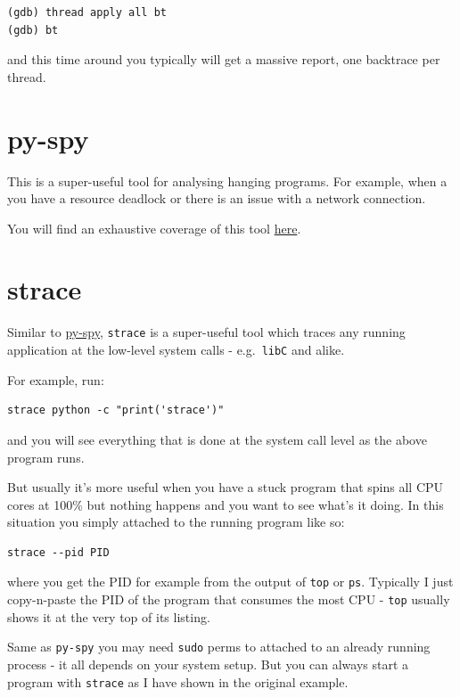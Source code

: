 \documentclass[
]{report}
\begin{document}
\begin{verbatim}
(gdb) thread apply all bt
(gdb) bt
\end{verbatim}

and this time around you typically will get a massive report, one
backtrace per thread.

\section{py-spy}\label{py-spy}

This is a super-useful tool for analysing hanging programs. For example,
when a you have a resource deadlock or there is an issue with a network
connection.

You will find an exhaustive coverage of this tool
\href{./torch-distributed-hanging-solutions.md\#py-spy}{here}.

\section{strace}\label{strace}

Similar to
\href{./torch-distributed-hanging-solutions.md\#py-spy}{py-spy},
\texttt{strace} is a super-useful tool which traces any running
application at the low-level system calls - e.g.~\texttt{libC} and
alike.

For example, run:

\begin{verbatim}
strace python -c "print('strace')"
\end{verbatim}

and you will see everything that is done at the system call level as the
above program runs.

But usually it's more useful when you have a stuck program that spins
all CPU cores at 100\% but nothing happens and you want to see what's it
doing. In this situation you simply attached to the running program like
so:

\begin{verbatim}
strace --pid PID
\end{verbatim}

where you get the PID for example from the output of \texttt{top} or
\texttt{ps}. Typically I just copy-n-paste the PID of the program that
consumes the most CPU - \texttt{top} usually shows it at the very top of
its listing.

Same as \texttt{py-spy} you may need \texttt{sudo} perms to attached to
an already running process - it all depends on your system setup. But
you can always start a program with \texttt{strace} as I have shown in
the original example.
\end{document}

